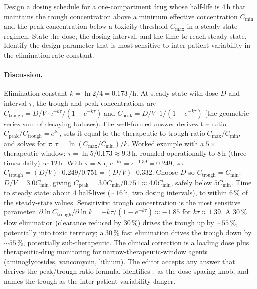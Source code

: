 \begin{exercise}
Design a dosing schedule for a one-compartment drug whose
half-life is $4\,\si{\hour}$ that maintains the trough
concentration above a minimum effective concentration $C_{\min}$
and the peak concentration below a toxicity threshold $C_{\max}$
in a steady-state regimen. State the dose, the dosing interval,
and the time to reach steady state. Identify the design
parameter that is most sensitive to inter-patient variability
in the elimination rate constant.

\paragraph{Discussion.} Elimination constant $k = \ln 2 / 4 =
0.173\,\si{\per\hour}$. At steady state with dose $D$ and
interval $\tau$, the trough and peak concentrations are
$C_{\text{trough}} = D/V \cdot e^{-k \tau}/(1 - e^{-k \tau})$
and $C_{\text{peak}} = D/V \cdot 1/(1 - e^{-k \tau})$ (the
geometric-series sum of decaying boluses). The well-formed
answer derives the ratio $C_{\text{peak}}/C_{\text{trough}} =
e^{k \tau}$, sets it equal to the therapeutic-to-trough ratio
$C_{\max}/C_{\min}$, and solves for $\tau$: $\tau = \ln
(C_{\max}/C_{\min}) / k$. Worked example with a $5\times$
therapeutic window: $\tau = \ln 5 / 0.173 \approx 9.3\,\si{\hour}$,
rounded operationally to $8\,\si{\hour}$ (three-times-daily) or
$12\,\si{\hour}$. With $\tau = 8\,\si{\hour}$, $e^{-k \tau} =
e^{-1.39} = 0.249$, so $C_{\text{trough}} = (D/V) \cdot 0.249 /
0.751 = (D/V) \cdot 0.332$. Choose $D$ so $C_{\text{trough}} =
C_{\min}$: $D/V = 3.0 C_{\min}$, giving $C_{\text{peak}} =
3.0 C_{\min} / 0.751 \approx 4.0 C_{\min}$, safely below
$5 C_{\min}$. Time to steady state: about $4$ half-lives
($\sim 16\,\si{\hour}$, two dosing intervals), to within $6\,\%$
of the steady-state values. Sensitivity: trough concentration
is the most sensitive parameter. $\partial \ln C_{\text{trough}}
/\partial \ln k = -k \tau / (1 - e^{-k \tau}) \approx -1.85$ for
$k \tau \approx 1.39$. A $30\,\%$ slow elimination (clearance
reduced by $30\,\%$) drives the trough up by $\sim 55\,\%$,
potentially into toxic territory; a $30\,\%$ fast elimination
drives the trough down by $\sim 55\,\%$, potentially
sub-therapeutic. The clinical correction is a loading dose plus
therapeutic-drug monitoring for narrow-therapeutic-window agents
(aminoglycosides, vancomycin, lithium). The editor accepts any
answer that derives the peak/trough ratio formula, identifies
$\tau$ as the dose-spacing knob, and names the trough as the
inter-patient-variability danger.
\end{exercise}

